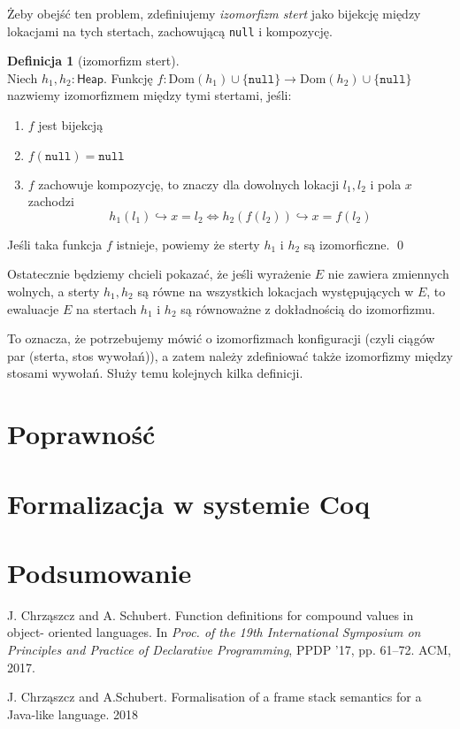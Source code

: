 \documentclass[]{pracamgr}
\renewcommand \| {\hspace{0.75em} | \hspace{0.75em} }
\renewcommand \[ {[\![}
\renewcommand \] {]\!]}
\theoremstyle{definition}
\newtheorem{definition}{Definicja}[section]
\begin{document}
Żeby obejść ten problem, zdefiniujemy \textit{izomorfizm stert} jako bijekcję między lokacjami
na tych stertach,
zachowującą \texttt{null} i kompozycję.

\begin{definition}[izomorfizm stert] {\ } \\
Niech $h_1, h_2 : \mathsf{Heap}$.
Funkcję $f : \mathrm{Dom}(h_1) \cup \{\mathtt{null}\} \to \mathrm{Dom}(h_2) \cup \{\mathtt{null}\}$
nazwiemy izomorfizmem między tymi stertami, jeśli:
\begin{enumerate}
 \item $f$ jest bijekcją
 \item $f(\mathtt{null}) = \mathtt{null}$
 \item $f$ zachowuje kompozycję, to znaczy dla dowolnych lokacji $l_1, l_2$ i pola $x$ zachodzi
    $$h_1(l_1) \hookrightarrow x = l_2 \iff h_2(f(l_2)) \hookrightarrow x = f(l_2)$$
\end{enumerate}
Jeśli taka funkcja $f$ istnieje, powiemy że sterty $h_1$ i $h_2$ są izomorficzne.
\qed
\end{definition}

Ostatecznie będziemy chcieli pokazać, że jeśli wyrażenie $E$ nie zawiera zmiennych wolnych,
a sterty $h_1, h_2$ są równe na wszystkich lokacjach występujących w $E$, to
ewaluacje $E$ na stertach $h_1$ i $h_2$ są równoważne z dokładnością do izomorfizmu.

To oznacza, że potrzebujemy mówić o izomorfizmach konfiguracji (czyli ciągów par (sterta, stos wywołań)),
a zatem należy zdefiniować także izomorfizmy między stosami wywołań.
Służy temu kolejnych kilka definicji.


\chapter{Poprawność}

\chapter{Formalizacja w systemie Coq}

\chapter{Podsumowanie}

\appendix
\begin{thebibliography}{99}

 J. Chrząszcz and A. Schubert. Function definitions for compound values in object-
oriented languages. In \textit{Proc. of the 19th International Symposium on Principles
and Practice of Declarative Programming}, PPDP ’17, pp. 61–72. ACM, 2017.

 J. Chrząszcz and A.Schubert. Formalisation of a frame stack semantics for a Java-like language. 2018

\end{thebibliography}
\end{document}
